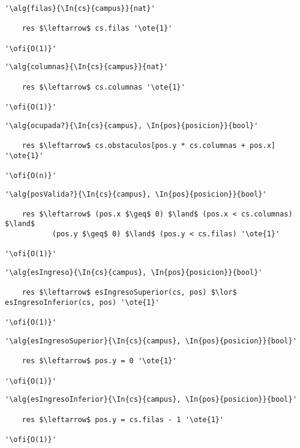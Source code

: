 \begin{lstlisting}[mathescape]
'\alg{filas}{\In{cs}{campus}}{nat}'

	res $\leftarrow$ cs.filas '\ote{1}'

'\ofi{O(1)}'
\end{lstlisting}

\begin{lstlisting}[mathescape]
'\alg{columnas}{\In{cs}{campus}}{nat}'

	res $\leftarrow$ cs.columnas '\ote{1}'

'\ofi{O(1)}'
\end{lstlisting}

\begin{lstlisting}[mathescape]
'\alg{ocupada?}{\In{cs}{campus}, \In{pos}{posicion}}{bool}'

	res $\leftarrow$ cs.obstaculos[pos.y * cs.columnas + pos.x] '\ote{1}'

'\ofi{O(n)}'
\end{lstlisting}

\begin{lstlisting}[mathescape]
'\alg{posValida?}{\In{cs}{campus}, \In{pos}{posicion}}{bool}'

	res $\leftarrow$ (pos.x $\geq$ 0) $\land$ (pos.x < cs.columnas) $\land$ 
	       (pos.y $\geq$ 0) $\land$ (pos.y < cs.filas) '\ote{1}'

'\ofi{O(1)}'
\end{lstlisting}

\begin{lstlisting}[mathescape]
'\alg{esIngreso}{\In{cs}{campus}, \In{pos}{posicion}}{bool}'

	res $\leftarrow$ esIngresoSuperior(cs, pos) $\lor$ esIngresoInferior(cs, pos) '\ote{1}'

'\ofi{O(1)}'
\end{lstlisting}

\begin{lstlisting}[mathescape]
'\alg{esIngresoSuperior}{\In{cs}{campus}, \In{pos}{posicion}}{bool}'
	
	res $\leftarrow$ pos.y = 0 '\ote{1}'

'\ofi{O(1)}'
\end{lstlisting}

\begin{lstlisting}[mathescape]
'\alg{esIngresoInferior}{\In{cs}{campus}, \In{pos}{posicion}}{bool}'
	
	res $\leftarrow$ pos.y = cs.filas - 1 '\ote{1}'

'\ofi{O(1)}'
\end{lstlisting}

